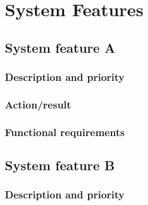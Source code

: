 \documentclass[10pt]{article}
\begin{document}








\section{System Features}

\subsection{System feature A}

\lipsum[10]

\subsubsection{Description and priority}

\lipsum[10]

\subsubsection{Action/result}

\lipsum[10]

\subsubsection{ Functional requirements}

\lipsum[10]








\subsection{System feature B}

\subsubsection{Description and priority}
\end{document}
